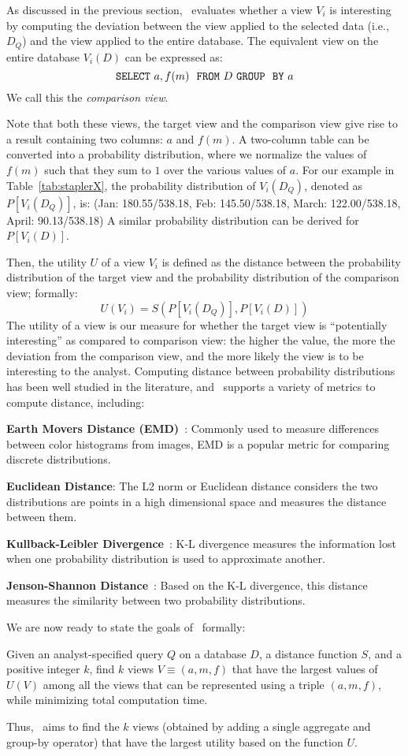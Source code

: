 As discussed in the previous section, \SeeDB\ evaluates
whether a view $V_i$ is interesting
by computing the deviation between the view applied to the selected data (i.e., $D_Q$) 
and the view applied to the entire database.
The equivalent view on the entire database $V_i (D)$ can be expressed as:
$${\tt SELECT \ } a, f(m) \ \ {\tt FROM} \  D\  {\tt GROUP \ \ BY} \ a$$
We call this the {\em comparison view}.

Note that both these views, the target view and the comparison view
give rise to a result containing two columns: $a$ and $f(m)$.
A two-column table can be converted into a probability
distribution, where we normalize the values of $f(m)$ such that
they sum to $1$ over the various values of $a$.
For our example in Table~\ref{tab:staplerX}, the probability
distribution of $V_i(D_Q)$, denoted as $P[V_i (D_Q)]$, 
is: (Jan: 180.55/538.18, Feb: 145.50/538.18, March: 122.00/538.18,  April: 90.13/538.18)
A similar probability distribution can be derived for $P[V_i (D)]$.

Then, the utility $U$ of a view $V_i$ is defined as the distance
between the probability distribution 
of the target view and the probability distribution of the 
comparison view; formally:
$$ U (V_i) = S ( P[V_i (D_Q)], P[V_i (D)] ) $$
The utility of a view is our measure for whether the target view 
is ``potentially interesting'' as compared to comparison view: 
the higher the value, the more the deviation
from the comparison view, and the more likely the view is to be interesting to the analyst.
Computing distance between probability distributions has
been well studied in the literature, and \SeeDB\ supports a variety of metrics
to compute distance, including:
\squishlist
  \item {\bf Earth Movers Distance (EMD)}~\cite{wikipedia-prob-dist}: Commonly used to
  measure differences between color histograms from images, EMD is a popular metric for comparing
  discrete distributions.
  \item {\bf Euclidean Distance}: The L2 norm or
  Euclidean distance considers the two distributions are points in a high dimensional space and measures the
  distance between them.
  \item {\bf Kullback-Leibler Divergence}~\cite{wikipedia-KL}: K-L divergence
  measures the information lost when one probability distribution is used to approximate
  another.
  \item {\bf Jenson-Shannon Distance}~\cite{wikipedia-JS,entropy-vis}: Based on
  the K-L divergence, this distance measures the similarity between two probability distributions.
\squishend

We are now ready to state the goals of \SeeDB\ formally:
\begin{goal}
Given an analyst-specified query $Q$ on a database $D$, a distance function $S$,
and a positive integer $k$, find $k$ views $V \equiv (a, m, f)$ that
have the largest values of $U(V)$ among all the views that can be represented
using a triple $(a, m, f)$, while minimizing total computation time.
\end{goal}
Thus, \SeeDB\ aims to find the $k$ views (obtained by adding a single aggregate and
group-by operator) that have the largest utility based on the function $U$.

